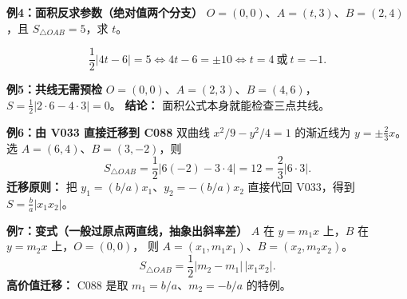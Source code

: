 \begin{examplebox}
\textbf{\textcolor{CExample}{例4：面积反求参数（绝对值两个分支）}}
$O=(0,0)$、$A=(t,3)$、$B=(2,4)$，且 $S_{\triangle OAB}=5$，求 $t$。

\[
 \frac12|4t-6|=5\iff 4t-6=\pm10\iff
 \boxed{t=4\ \text{或}\ t=-1}.
\]

\medskip
\textbf{\textcolor{CExample}{例5：共线无需预检}}
$O=(0,0)$、$A=(2,3)$、$B=(4,6)$，
$S=\tfrac12|2\cdot6-4\cdot3|=0$。
\textbf{结论：} 面积公式本身就能检查三点共线。

\medskip
\textbf{\textcolor{CExample}{例6：由 V033 直接迁移到 C088}}
双曲线 $x^2/9-y^2/4=1$ 的渐近线为 $y=\pm\frac23x$。
选 $A=(6,4)$、$B=(3,-2)$，则
\[
 S_{\triangle OAB}=\frac12|6(-2)-3\cdot4|=12
 =\frac23|6\cdot3|.
\]
\textbf{迁移原则：} 把 $y_1=(b/a)x_1$、$y_2=-(b/a)x_2$ 直接代回 V033，得到 $S=\frac ba|x_1x_2|$。

\medskip
\textbf{\textcolor{CExample}{例7：变式（一般过原点两直线，抽象出斜率差）}}
$A$ 在 $y=m_1x$ 上，$B$ 在 $y=m_2x$ 上，$O=(0,0)$，
则 $A=(x_1,m_1x_1)$、$B=(x_2,m_2x_2)$。
\[
 \boxed{S_{\triangle OAB}=\frac12|m_2-m_1|\,|x_1x_2|.}
\]
\textbf{高价值迁移：} C088 是取 $m_1=b/a$、$m_2=-b/a$ 的特例。
\end{examplebox}

